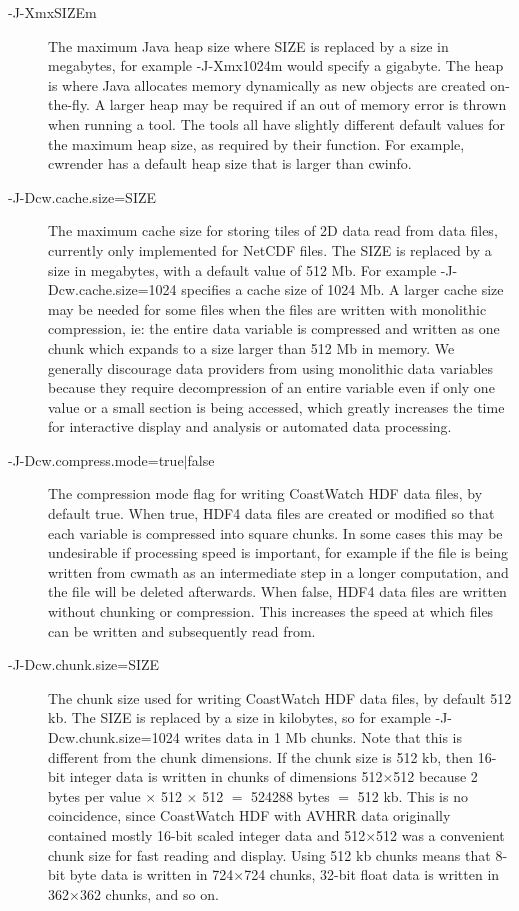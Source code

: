 \begin{description}

  \item[{\file -J-XmxSIZEm}] The maximum Java heap size where SIZE is replaced
  by a size in megabytes, for example {\file -J-Xmx1024m} would specify a
  gigabyte.  The heap is where Java allocates memory dynamically as new objects
  are created on-the-fly.  A larger heap may be required if an out of memory
  error is thrown when running a tool.  The tools all have slightly different
  default values for the maximum heap size, as required by their function.
  For example, cwrender has a default heap size that is larger than cwinfo.

  \item[{\file -J-Dcw.cache.size=SIZE}] The maximum cache size for storing
  tiles of 2D data read from data files, currently only implemented for NetCDF
  files.  The SIZE is replaced by a size in megabytes, with a default value
  of 512 Mb.  For example {\file -J-Dcw.cache.size=1024} specifies a cache
  size of 1024 Mb.  A larger cache size may be needed for some files when the
  files are written with monolithic compression, ie: the entire data variable
  is compressed and written as one chunk which expands to a size larger than
  512 Mb in memory.  We generally discourage data providers from using monolithic data
  variables because they require decompression of an entire variable even if
  only one value or a small section is being accessed, which greatly increases
  the time for interactive display and analysis or automated data processing.

  \item[{\file -J-Dcw.compress.mode=true$|$false}] The compression mode flag for
  writing CoastWatch HDF data files, by default true.  When true, HDF4 data
  files are created or modified so that each variable is compressed into
  square chunks.  In some cases this may be undesirable if processing speed
  is important, for example if the file is being written from cwmath
  as an intermediate step in a longer computation, and the file will be
  deleted afterwards.  When false, HDF4 data files are written without
  chunking or compression.  This increases the speed at which files can be
  written and subsequently read from.

  \item[{\file -J-Dcw.chunk.size=SIZE}] The chunk size used for writing
  CoastWatch HDF data files, by default 512 kb.  The SIZE is replaced by
  a size in kilobytes, so for example {\file -J-Dcw.chunk.size=1024} writes
  data in 1 Mb chunks.  Note that this is different from the chunk dimensions.
  If the chunk size is 512 kb, then 16-bit integer data is written in
  chunks of dimensions 512$\times$512 because 2 bytes per value $\times$ 512
  $\times$ 512 $=$ 524288 bytes $=$ 512 kb.  This is no coincidence, since
  CoastWatch HDF with AVHRR data originally contained mostly 16-bit scaled
  integer data and 512$\times$512 was a convenient chunk size for fast
  reading and display.  Using 512 kb chunks means that 8-bit byte data is written
  in 724$\times$724 chunks, 32-bit float data is written in 362$\times$362
  chunks, and so on.


\end{description}
